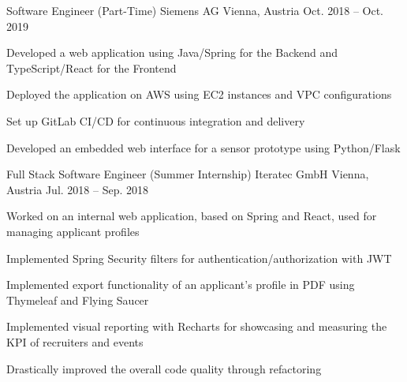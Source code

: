 


\begin{cventries}


\cventry
{Software Engineer (Part-Time)} %
{Siemens AG} %
{Vienna, Austria} %
{Oct. 2018 -- Oct. 2019} %
{ %
\begin{cvitems}
\item {Developed a web application using Java/Spring for the Backend and TypeScript/React for the Frontend}
\item {Deployed the application on AWS using EC2 instances and VPC configurations}
\item {Set up GitLab CI/CD for continuous integration and delivery}
\item {Developed an embedded web interface for a sensor prototype using Python/Flask}
\end{cvitems}
}


\cventry
{Full Stack Software Engineer (Summer Internship)} %
{Iteratec GmbH} %
{Vienna, Austria} %
{Jul. 2018 -- Sep. 2018} %
{ %
\begin{cvitems}
\item {Worked on an internal web application, based on Spring and React, used for managing applicant profiles}
\item {Implemented Spring Security filters for authentication/authorization with JWT}
\item {Implemented export functionality of an applicant's profile in PDF using Thymeleaf and Flying Saucer}
\item {Implemented visual reporting with Recharts for showcasing and measuring the KPI of recruiters and events}
\item {Drastically improved the overall code quality through refactoring}
\end{cvitems}
}


\end{cventries}
